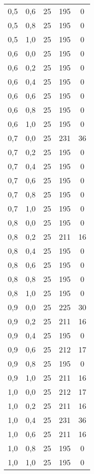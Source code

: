 \begin{center}
\begin{scriptsize}
\begin{longtable}[h]{| c | c | c || c | c |}
		0,5 & 0,6 & 25 & 195 & 0         \\
		0,5 & 0,8 & 25 & 195 & 0         \\
		0,5 & 1,0 & 25 & 195 & 0         \\
		\hline
		0,6 & 0,0 & 25 & 195 & 0         \\
		0,6 & 0,2 & 25 & 195 & 0         \\
		0,6 & 0,4 & 25 & 195 & 0         \\
		0,6 & 0,6 & 25 & 195 & 0         \\
		0,6 & 0,8 & 25 & 195 & 0         \\
		0,6 & 1,0 & 25 & 195 & 0         \\
		\hline
		0,7 & 0,0 & 25 & 231 & 36        \\
		0,7 & 0,2 & 25 & 195 & 0         \\
		0,7 & 0,4 & 25 & 195 & 0         \\
		0,7 & 0,6 & 25 & 195 & 0         \\
		0,7 & 0,8 & 25 & 195 & 0         \\
		0,7 & 1,0 & 25 & 195 & 0         \\
		\hline
		0,8 & 0,0 & 25 & 195 & 0         \\
		0,8 & 0,2 & 25 & 211 & 16        \\
		0,8 & 0,4 & 25 & 195 & 0         \\
		0,8 & 0,6 & 25 & 195 & 0         \\
		0,8 & 0,8 & 25 & 195 & 0         \\
		0,8 & 1,0 & 25 & 195 & 0         \\
		\hline
		0,9 & 0,0 & 25 & 225 & 30        \\
		0,9 & 0,2 & 25 & 211 & 16        \\
		0,9 & 0,4 & 25 & 195 & 0         \\
		0,9 & 0,6 & 25 & 212 & 17        \\
		0,9 & 0,8 & 25 & 195 & 0         \\
		0,9 & 1,0 & 25 & 211 & 16        \\
		\hline
		1,0 & 0,0 & 25 & 212 & 17        \\
		1,0 & 0,2 & 25 & 211 & 16        \\
		1,0 & 0,4 & 25 & 231 & 36        \\
		1,0 & 0,6 & 25 & 211 & 16        \\
		1,0 & 0,8 & 25 & 195 & 0         \\
		1,0 & 1,0 & 25 & 195 & 0         \\
		\hline
	\end{longtable}
	\end{scriptsize}
\end{center}


